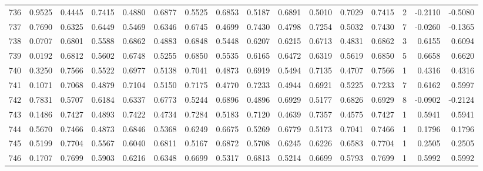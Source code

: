 \begin{tabular}{lrrrrrrrrrrrrrrr}
736 &      0.9525 &  0.4445 &  0.7415 &  0.4880 &  0.6877 &  0.5525 &  0.6853 &  0.5187 &  0.6891 &  0.5010 &   0.7029 &     0.7415 &      2 &                   -0.2110 &                    -0.5080 \\
737 &      0.7690 &  0.6325 &  0.6449 &  0.5469 &  0.6346 &  0.6745 &  0.4699 &  0.7430 &  0.4798 &  0.7254 &   0.5032 &     0.7430 &      7 &                   -0.0260 &                    -0.1365 \\
738 &      0.0707 &  0.6801 &  0.5588 &  0.6862 &  0.4883 &  0.6848 &  0.5448 &  0.6207 &  0.6215 &  0.6713 &   0.4831 &     0.6862 &      3 &                    0.6155 &                     0.6094 \\
739 &      0.0192 &  0.6812 &  0.5602 &  0.6748 &  0.5255 &  0.6850 &  0.5535 &  0.6165 &  0.6472 &  0.6319 &   0.5619 &     0.6850 &      5 &                    0.6658 &                     0.6620 \\
740 &      0.3250 &  0.7566 &  0.5522 &  0.6977 &  0.5138 &  0.7041 &  0.4873 &  0.6919 &  0.5494 &  0.7135 &   0.4707 &     0.7566 &      1 &                    0.4316 &                     0.4316 \\
741 &      0.1071 &  0.7068 &  0.4879 &  0.7104 &  0.5150 &  0.7175 &  0.4770 &  0.7233 &  0.4944 &  0.6921 &   0.5225 &     0.7233 &      7 &                    0.6162 &                     0.5997 \\
742 &      0.7831 &  0.5707 &  0.6184 &  0.6337 &  0.6773 &  0.5244 &  0.6896 &  0.4896 &  0.6929 &  0.5177 &   0.6826 &     0.6929 &      8 &                   -0.0902 &                    -0.2124 \\
743 &      0.1486 &  0.7427 &  0.4893 &  0.7422 &  0.4734 &  0.7284 &  0.5183 &  0.7120 &  0.4639 &  0.7357 &   0.4575 &     0.7427 &      1 &                    0.5941 &                     0.5941 \\
744 &      0.5670 &  0.7466 &  0.4873 &  0.6846 &  0.5368 &  0.6249 &  0.6675 &  0.5269 &  0.6779 &  0.5173 &   0.7041 &     0.7466 &      1 &                    0.1796 &                     0.1796 \\
745 &      0.5199 &  0.7704 &  0.5567 &  0.6040 &  0.6811 &  0.5167 &  0.6872 &  0.5708 &  0.6245 &  0.6226 &   0.6583 &     0.7704 &      1 &                    0.2505 &                     0.2505 \\
746 &      0.1707 &  0.7699 &  0.5903 &  0.6216 &  0.6348 &  0.6699 &  0.5317 &  0.6813 &  0.5214 &  0.6699 &   0.5793 &     0.7699 &      1 &                    0.5992 &                     0.5992 \\

\end{tabular}
